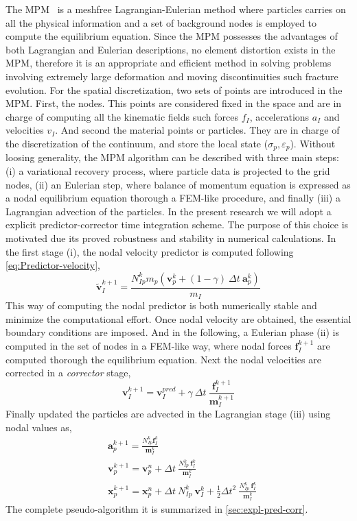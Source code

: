 \documentclass[preprint,12pt,a4paper]{elsarticle}
\newcommand{\vec}[1]{
  \ensuremath{\mathbf{{#1}}}
}
\newcommand{\tens}[1]{
  \ensuremath{\mathbf{{#1}}}
}
\begin{document}
The MPM~\cite{Sulsky1994} is a meshfree Lagrangian-Eulerian method
where particles carries on all the physical information and a set of
background nodes is employed to compute the equilibrium
equation. Since the MPM possesses the advantages of both Lagrangian
and Eulerian descriptions, no element distortion exists in the MPM,
therefore it is an appropriate and efficient method in solving
problems involving extremely large deformation and moving
discontinuities such fracture evolution. For the spatial
discretization, two sets of points are introduced in 
the MPM. First, the nodes. This points are considered fixed in the
space and are in charge of computing all the kinematic fields such
forces $f_I$, accelerations $a_I$ and velocities $v_I$. And second the
material points or particles. They are in charge of the discretization
of the continuum, and store the local state ($\sigma_p,
\varepsilon_p$). Without loosing generality, the MPM algorithm can be
described with three main steps: (i) a
variational recovery process, where particle data is projected to the
grid nodes, (ii) an Eulerian step, where balance of momentum equation
is expressed as a nodal equilibrium equation thorough a FEM-like
procedure, and finally (iii) a Lagrangian advection of the
particles. In the present research we will adopt a explicit
predictor-corrector time integration scheme. The purpose of this
choice is motivated due its proved robustness and stability in
numerical calculations. In the first stage (i), the nodal velocity
predictor is computed following \eqref{eq:Predictor-velocity}, 
\begin{equation}
  \label{eq:Predictor-velocity}
  \vec{\tilde{v}}_I^{k+1} = \frac{ N_{Ip}^{k} m_p (\vec{v}_p^k + (1 - \gamma)\ \Delta t\ \vec{a}_p^k)}{m_I}
\end{equation}
This way of computing the nodal predictor is both numerically stable
and minimize the computational effort. Once nodal velocity are
obtained, the essential boundary conditions are imposed. And in the
following, a Eulerian phase (ii) is computed in the set of nodes in a
FEM-like way, where nodal forces $\vec{f}_{I}^{k+1}$ are computed thorough the
equilibrium equation. Next the nodal velocities are corrected in a
\textit{corrector} stage,
\begin{equation}
  \label{eq:Corrector-velocity}
  \vec{v}_{I}^{k+1} = \vec{v}_{I}^{pred} + \gamma\ \Delta t\ \frac{\vec{f}_{I}^{k+1}}{\tens{m}_I^{k+1}}
\end{equation}
Finally updated the particles are advected in the Lagrangian stage (iii) using nodal values as,
\begin{align}
  \label{eq:Update-lagrangian-pce}
        &\vec{a}_p^{k+1} = \frac{N_{Ip}^k\vec{f}_{I}^{k}}{\tens{m}_I^k}\\
      &\vec{v}_p^{k+1} = \vec{v}_p^n + \Delta t\
        \frac{N_{Ip}^k\
        \vec{f}_{I}^{k}}{\tens{m}_I^k}\\
      &\vec{x}_p^{k+1} = \vec{x}_p^n + \Delta t\
         N_{Ip}^k\ \vec{v}_{I}^{k} +
        \frac{1}{2}\Delta t^2\ \frac{N_{Ip}^k\
        \vec{f}_{I}^{k}}{\tens{m}_I^k} 
\end{align}
The complete pseudo-algorithm it is summarized in \ref{sec:expl-pred-corr}.
\end{document}
